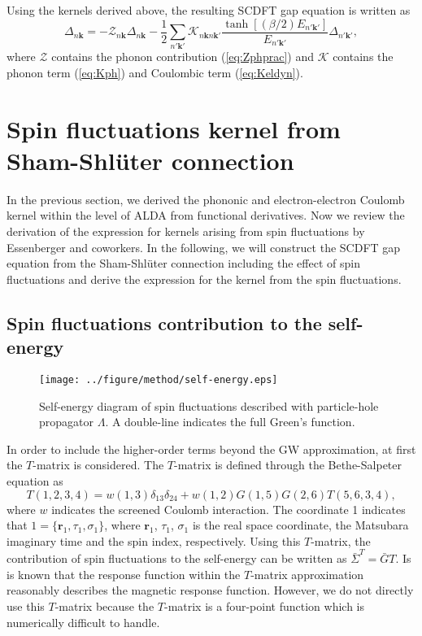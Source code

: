 Using the kernels derived above, the resulting SCDFT gap equation is written as
%
\begin{equation}
	\Delta_{n\bm k} = -{\mathcal Z}_{n \bm k}\Delta_{n\bm k} - \frac{1}{2}
	\sum_{n'\bm k'}{\mathcal K}_{n\bm k n \bm k'}
	\frac{\tanh[(\beta/2)E_{n' \bm k'}]}{E_{n' \bm k'}}\Delta_{n' \bm k'},
	\label{eq:truegapeq}
\end{equation}
%
where $\mathcal Z$ contains the phonon contribution (\ref{eq:Zphprac}) and $\mathcal K$ contains 
the phonon term (\ref{eq:Kph}) and Coulombic term (\ref{eq:Keldyn}).
\section{Spin fluctuations kernel from Sham-Shl\"{u}ter connection}
In the previous section, we derived the phononic and 
electron-electron Coulomb kernel within the level of ALDA from functional derivatives.
Now we review the derivation of the expression for kernels arising 
from spin fluctuations by Essenberger and coworkers\cite{Essenberger2014}.
In the following, we will construct the SCDFT gap equation from the Sham-Shl\"{u}ter connection
including the effect of spin fluctuations and derive the expression for the kernel from the spin fluctuations.

\subsection{Spin fluctuations contribution to the self-energy}

\begin{figure} %
	\centering
	\texttt{[image: ../figure/method/self-energy.eps]}
	\caption{Self-energy diagram of spin fluctuations described with particle-hole propagator $\Lambda$. A double-line indicates the full Green's function.}
	\label{fig:SF-self}
\end{figure}

In order to include the higher-order terms beyond the GW approximation, at first the $T$-matrix\cite{Gordon1961,Ersoy2010} is considered.
The $T$-matrix is defined through the Bethe-Salpeter equation\cite{BSE1951} as
%
\begin{equation}
	T(1,2,3,4) = w(1,3)\delta_{13}\delta_{24} + 
	w(1,2)G(1,5)G(2,6)T(5,6,3,4),
	\label{eq:T-BSE}
\end{equation}
%
where $w$ indicates the screened Coulomb interaction.
The coordinate 1 indicates that $1=\{\bm r_1, \tau_1, \sigma_1\}$, 
where $\bm r_1$, $\tau_1$, $\sigma_1$ is the real space coordinate,
the Matsubara imaginary time and the spin index, respectively.
Using this $T$-matrix, the contribution of spin fluctuations to the self-energy can be written as $\bar{\Sigma}^{T}=\bar{G}T$.
Is is known that the response function within the $T$-matrix approximation reasonably describes the magnetic response function\cite{Ersoy2010,Onida2002}.
However, we do not directly use this $T$-matrix because the $T$-matrix is a four-point function
which is numerically difficult to handle.

